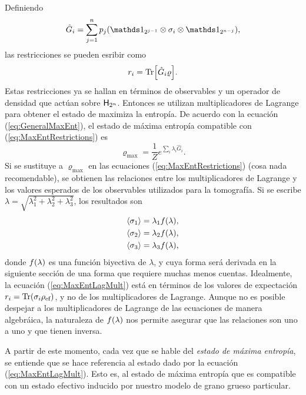 Definiendo
\begin{equation}\label{eq:GhatNM}
    \hat{G}_{i}=\sum_{j=1}^{n}p_{j}(\Id_{2^{j-1}}\otimes\sigma_{i}\otimes\Id_{2^{n-j}}),
\end{equation}
las restricciones se pueden esribir como
\begin{equation}\label{eq:MaxEntRestrictions}
    r_{i}=\Tr[\hat{G}_{i}\varrho].
\end{equation}
Estas restricciones ya se hallan en términos de observables y un operador de densidad que actúan sobre ${\sf H}_{2^{n}}$. Entonces se utilizan multiplicadores de Lagrange para obtener el estado de maximiza la entropía. De acuerdo con la ecuación (\ref{eq:GeneralMaxEnt}), el estado de máxima entropía compatible con (\ref{eq:MaxEntRestrictions}) es
\begin{equation}\label{eq:MaxEntLagMult}
    \varrho_{\max}=\frac{1}{Z}e^{\sum_{i}\lambda_{i}\hat{G}_{i}}.
\end{equation}
Si se sustituye a $\varrho_{\max}$ en las ecuaciones (\ref{eq:MaxEntRestrictions}) (cosa nada recomendable), se obtienen las relaciones entre los multiplicadores de Lagrange y los valores esperados de los observables utilizados para la tomografía. Si se escribe $\lambda=\sqrt{\lambda_{1}^{2}+\lambda_{2}^{2}+\lambda_{3}^{2}}$, los resultados son
\begin{align}\label{eq:MaxEntExpVals}
    \begin{split}
    \expval{\sigma_{1}}&=\lambda_{1}f(\lambda),\\
    \expval{\sigma_{2}}&=\lambda_{2}f(\lambda),\\
    \expval{\sigma_{3}}&=\lambda_{3}f(\lambda),
    \end{split}
\end{align}
donde $f(\lambda)$ es una función biyectiva de $\lambda$, y cuya forma será derivada en la siguiente sección de una forma que requiere muchas menos cuentas. Idealmente, la ecuación (\ref{eq:MaxEntLagMult}) está en términos de los valores de expectación $r_{i}=\Tr(\sigma_{i}\rho_{\text{ef}})$, y no de los multiplicadores de Lagrange. Aunque no es posible despejar a los multiplicadores de Lagrange de las ecuaciones de manera algebráica, la naturaleza de $f(\lambda)$ nos permite asegurar que las relaciones son uno a uno y que tienen inversa.

A partir de este momento, cada vez que se hable del \textit{estado de máxima entropía}, se entiende que se hace referencia al estado dado por la ecuación (\ref{eq:MaxEntLagMult}). Esto es, al estado de máxima entropía que es compatible con un estado efectivo inducido por nuestro modelo de grano grueso particular.